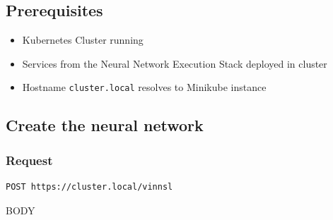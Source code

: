 \subsection{Prerequisites}\label{prerequisites-4}

\begin{itemize}
\tightlist
\item
  Kubernetes Cluster running
\item
  Services from the Neural Network Execution Stack deployed in cluster
\item
  Hostname \texttt{cluster.local} resolves to Minikube instance
\end{itemize}

\subsection{Create the neural network}\label{create-the-neural-network}

\subsubsection{Request}\label{request}

\begin{verbatim}
POST https://cluster.local/vinnsl
\end{verbatim}

BODY

